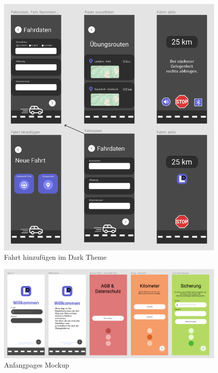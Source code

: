 \begin{figure}[H]
	\centering
	\includegraphics[width=15cm]{figures/mockup2.png}
	\caption{Fahrt hinzufügen im Dark Theme}
	\label{fig:mockup2}
\end{figure}

\begin{figure}[H]
	\centering
	\includegraphics[width=15cm]{figures/mockup1.png}
	\caption{Anfangpages Mockup}
	\label{fig:mockup1}
\end{figure}

